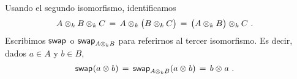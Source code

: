 \begin{obsProductoTensorialDeModulos}\label{obs:productotensorialdemodulos}
	Usando el segundo isomorfismo, identificamos
	\begin{align*}
		A\tensor[k]B\tensor[k]C & \,=\,
			A\tensor[k]\big(B\tensor[k] C\big) \,=\,
			\big(A\tensor[k]B\big)\tensor[k]C
		\text{ .}
	\end{align*}
	Escribimos $\swap$ o $\swap[{A\tensor[k]B}]$ para referirnos al tercer
	isomorfismo. Es decir, dados $a\in A$ y $b\in B$,
	\begin{align*}
		\swap(a\tensor b) & \,=\,
			\swap[{A\tensor[k]B}](a\tensor b) \,=\,	b\tensor a
		\text{ .}
	\end{align*}
\end{obsProductoTensorialDeModulos}
%
